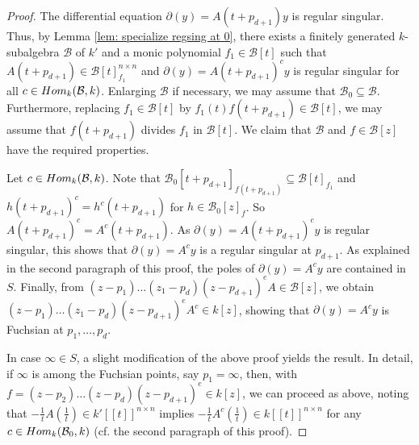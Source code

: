 \documentclass[10pt,a4paper]{amsart}
\def\l{\mathcal}
\def\del{\partial}
\def\Hom{\textup{Hom}}
\begin{document}
\begin{proof}
%	
%	
%	
%	
	 The differential equation $\del(y)=A(t+p_{d+1})y$ is regular singular. Thus, by Lemma \ref{lem: specialize regsing at 0}, there exists a finitely generated $k$-subalgebra $\l B$ of $k'$ and a monic polynomial $f_1\in \l B[t]$ such that $A(t+p_{d+1})\in \l B[t]_{f_1}^{n\times n}$ and $\del(y)=A(t+p_{d+1})^cy$ is regular singular for all $c\in\Hom_k(\l B,k)$. Enlarging $\l B$ if necessary, we may assume that $\l B_0\subseteq \l B$. Furthermore, replacing $f_1\in \l B[t]$ by $f_1(t)f(t+p_{d+1})\in \l B[t]$, we may assume that $f(t+p_{d+1})$ divides $f_1$ in $\l B[t]$.
	 We claim that $\l B$ and $f\in\l B[z]$ have the required properties. 
	 
	 Let $c\in\Hom_k(\l B,k)$. Note that $\l B_0[t+p_{d+1}]_{f(t+p_{d+1})}\subseteq \l B[t]_{f_1}$ and $h(t+p_{d+1})^c=h^c(t+p_{d+1})$ for $h\in \l B_0[z]_{f}$. So  $A(t+p_{d+1})^c=A^c(t+p_{d+1})$.
	  As $\del(y)=A(t+p_{d+1})^cy$ is regular singular, this shows that $\del (y)=A^cy$ is a regular singular at $p_{d+1}$. As explained in the second paragraph of this proof, the poles of $\del (y)=A^cy$ are contained in $S$.
	 Finally, from $(z-p_1)\ldots(z_1-p_d)(z-p_{d+1})^eA\in \l B[z]$, we obtain $(z-p_1)\ldots(z_1-p_d)(z-p_{d+1})^eA^c\in k[z]$, showing that $\del (y)=A^cy$ is Fuchsian at $p_1,\ldots,p_{d}$.
	 
	 In case $\infty\in S$, a slight modification of the above proof yields the result. In detail, if $\infty$ is among the Fuchsian points, say $p_1=\infty$, then, with $f=(z-p_2)\ldots(z-p_d)(z-p_{d+1})^e\in k[z]$, we can proceed as above, noting that $-\frac{1}{t}A(\frac{1}{t})\in k'[[t]]^{n\times n}$ implies $-\frac{1}{t}A^c(\frac{1}{t})\in k[[t]]^{n\times n}$ for any $c\in\Hom_k(\l B_0,k)$ (cf. the second paragraph of this proof).
	 

\end{proof}
\end{document}
